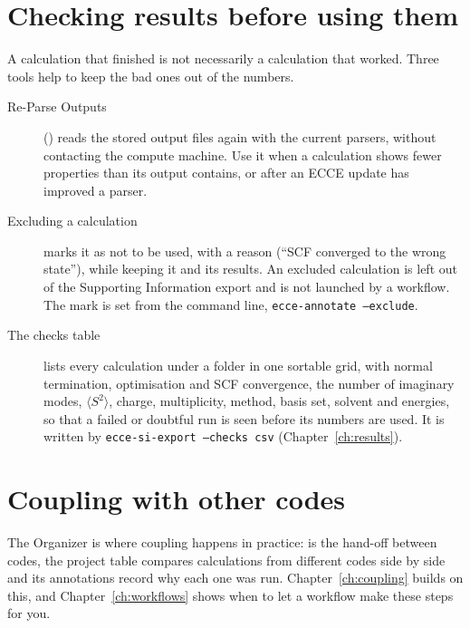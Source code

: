 \section{Checking results before using them}
A calculation that finished is not necessarily a calculation that worked. Three tools help to keep the bad ones out of the numbers.
\begin{description}
	\item[Re-Parse Outputs] () reads the stored output files again with the current parsers, without contacting the compute machine. Use it when a calculation shows fewer properties than its output contains, or after an ECCE update has improved a parser.
	\item[Excluding a calculation] marks it as not to be used, with a reason (``SCF converged to the wrong state''), while keeping it and its results. An excluded calculation is left out of the Supporting Information export and is not launched by a workflow. The mark is set from the command line, \texttt{ecce-annotate --exclude}.
	\item[The checks table] lists every calculation under a folder in one sortable grid, with normal termination, optimisation and SCF convergence, the number of imaginary modes, $\langle S^2\rangle$, charge, multiplicity, method, basis set, solvent and energies, so that a failed or doubtful run is seen before its numbers are used. It is written by \texttt{ecce-si-export --checks csv} (Chapter~\ref{ch:results}).
\end{description}

\section{Coupling with other codes}
The Organizer is where coupling happens in practice:  is the hand-off between codes, the project table compares calculations from different codes side by side and its annotations record why each one was run. Chapter~\ref{ch:coupling} builds on this, and Chapter~\ref{ch:workflows} shows when to let a workflow make these steps for you.
